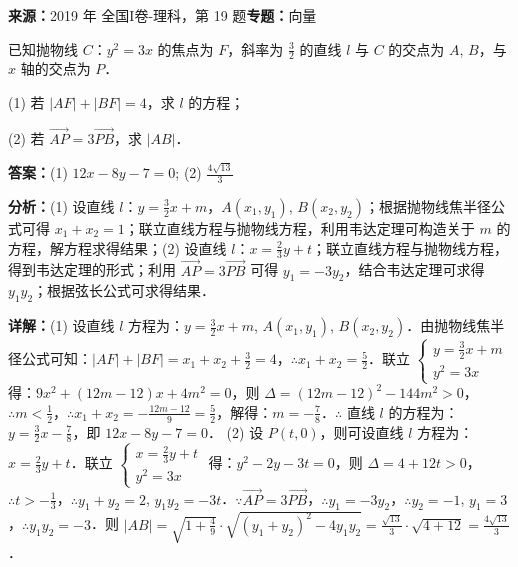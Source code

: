 \begin{question}[points=12]
\textbf{来源：}2019 年 全国I卷-理科，第 19 题\quad \textbf{专题：}向量\par
已知抛物线 $C$：$y^2 = 3x$ 的焦点为 $F$，斜率为 $\frac{3}{2}$ 的直线 $l$ 与 $C$ 的交点为 $A$, $B$，与 $x$ 轴的交点为 $P$．

(1) 若 $|AF| + |BF| = 4$，求 $l$ 的方程；

(2) 若 $\overrightarrow{AP} = 3\overrightarrow{PB}$，求 $|AB|$．
\begin{solution}
\textbf{答案：}(1) $12x - 8y - 7 = 0$; (2) $\frac{4\sqrt{13}}{3}$

\textbf{分析：}(1) 设直线 $l$：$y = \frac{3}{2}x + m$，$A(x_1, y_1)$, $B(x_2, y_2)$；根据抛物线焦半径公式可得 $x_1 + x_2 = 1$；联立直线方程与抛物线方程，利用韦达定理可构造关于 $m$ 的方程，解方程求得结果；(2) 设直线 $l$：$x = \frac{2}{3}y + t$；联立直线方程与抛物线方程，得到韦达定理的形式；利用 $\overrightarrow{AP} = 3\overrightarrow{PB}$ 可得 $y_1 = -3y_2$，结合韦达定理可求得 $y_1y_2$；根据弦长公式可求得结果．

\textbf{详解：}(1) 设直线 $l$ 方程为：$y = \frac{3}{2}x + m$, $A(x_1, y_1)$, $B(x_2, y_2)$．由抛物线焦半径公式可知：$|AF| + |BF| = x_1 + x_2 + \frac{3}{2} = 4$，$\therefore x_1 + x_2 = \frac{5}{2}$．联立 $\begin{cases} y = \frac{3}{2}x + m \\ y^2 = 3x \end{cases}$ 得：$9x^2 + (12m - 12)x + 4m^2 = 0$，则 $\Delta = (12m - 12)^2 - 144m^2 > 0$，$\therefore m < \frac{1}{2}$，$\therefore x_1 + x_2 = -\frac{12m - 12}{9} = \frac{5}{2}$，解得：$m = -\frac{7}{8}$．$\therefore$ 直线 $l$ 的方程为：$y = \frac{3}{2}x - \frac{7}{8}$，即 $12x - 8y - 7 = 0$．
(2) 设 $P(t, 0)$，则可设直线 $l$ 方程为：$x = \frac{2}{3}y + t$．联立 $\begin{cases} x = \frac{2}{3}y + t \\ y^2 = 3x \end{cases}$ 得：$y^2 - 2y - 3t = 0$，则 $\Delta = 4 + 12t > 0$，$\therefore t > -\frac{1}{3}$，$\therefore y_1 + y_2 = 2$, $y_1y_2 = -3t$．$\because \overrightarrow{AP} = 3\overrightarrow{PB}$，$\therefore y_1 = -3y_2$，$\therefore y_2 = -1$, $y_1 = 3$，$\therefore y_1y_2 = -3$．则 $|AB| = \sqrt{1 + \frac{4}{9}} \cdot \sqrt{(y_1 + y_2)^2 - 4y_1y_2} = \frac{\sqrt{13}}{3} \cdot \sqrt{4 + 12} = \frac{4\sqrt{13}}{3}$．
\end{solution}
\end{question}

